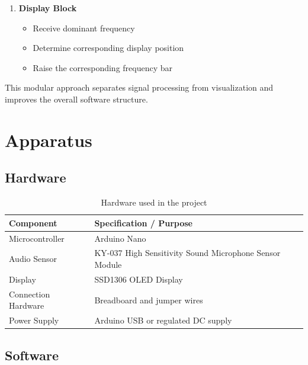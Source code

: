 \documentclass{article}
\begin{document}
\begin{center}
\begin{enumerate}
    \item \textbf{Display Block}
    \begin{itemize}
        \item Receive dominant frequency
        \item Determine corresponding display position
        \item Raise the corresponding frequency bar
    \end{itemize}
\end{enumerate}

This modular approach separates signal processing from visualization and improves the overall software structure.

\newpage


\section{Apparatus}

\subsection{Hardware}

\begin{table}[H]
\centering
\caption{Hardware used in the project}
\begin{tabular}{|p{5cm}|p{8cm}|}
\hline
\textbf{Component} & \textbf{Specification / Purpose} \\
\hline

Microcontroller & Arduino Nano\\
\hline

Audio Sensor & KY-037 High Sensitivity Sound Microphone Sensor Module \\
\hline

Display & SSD1306 OLED Display \\
\hline


Connection Hardware & Breadboard and jumper wires \\
\hline

Power Supply & Arduino USB or regulated DC supply \\
\hline

\end{tabular}
\end{table}

\subsection{Software}


\end{center}
\end{document}
